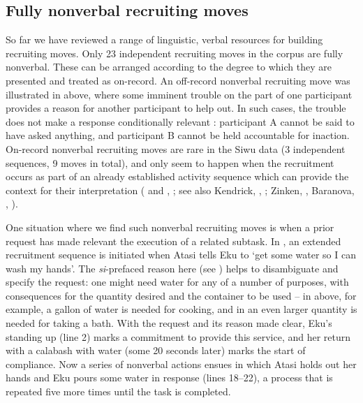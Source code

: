 \documentclass[output=paper]{langsci/langscibook}
\begin{document}
\subsection{Fully nonverbal recruiting moves}\label{sec:dingemanse:3.4}

So far we have reviewed a range of linguistic, verbal resources for building recruiting moves. Only 23 independent recruiting moves in the corpus are fully nonverbal. These can be arranged according to the degree to which they are presented and treated as on-record. An off-record nonverbal recruiting move was illustrated in  above, where some imminent trouble on the part of one participant provides a reason for another participant to help out. In such cases, the trouble does not make a response conditionally relevant \citep{Schegloff1968}: participant A cannot be said to have asked anything, and participant B cannot be held accountable for inaction. On-record nonverbal recruiting moves are rare in the Siwu data (3 independent sequences, 9 moves in total), and only seem to happen when the recruitment occurs as part of an already established activity sequence which can provide the context for their interpretation (\citealt{Rossi2014} and , ; see also Kendrick, , ; Zinken, ,  Baranova, , ).

One situation where we find such nonverbal recruiting moves is when a prior request has made relevant the execution of a related subtask. In  , an extended recruitment sequence is initiated when Atasi tells Eku to ‘get some water so I can wash my hands’. The \textit{si}-prefaced reason here (see ) helps to disambiguate and specify the request: one might need water for any of a number of purposes, with consequences for the quantity desired and the container to be used -- in  above, for example, a gallon of water is needed for cooking, and in  an even larger quantity is needed for taking a bath. With the request and its reason made clear, Eku’s standing up (line 2) marks a commitment to provide this service, and her return with a calabash with water (some 20 seconds later) marks the start of compliance. Now a series of nonverbal actions ensues in which Atasi holds out her hands and Eku pours some water in response (lines 18--22), a process that is repeated five more times until the task is completed.
\end{document}
